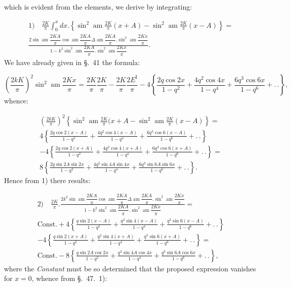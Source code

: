 \documentclass{article}
\begin{document}
which is evident from the elements, we derive by integrating:

\[
\begin{gathered}
\text{1)}\quad\frac{2K}{\pi}\int_{0}^{x}dx.\left\{\sin^{2}\operatorname{am}\frac{2K}{\pi}(x+A)-\sin^{2}\operatorname{am}\frac{2K}{\pi}(x-A)\right\}=\\[1.5ex]
\frac{2\sin\operatorname{am}\dfrac{2KA}{\pi}\cos\operatorname{am}\dfrac{2KA}{\pi}\Delta\operatorname{am}\dfrac{2KA}{\pi}.\sin^{2}\operatorname{am}\dfrac{2Kx}{\pi}}{1-k^{2}\sin^{2}\operatorname{am}\dfrac{2KA}{\pi}.\sin^{2}\operatorname{am}\dfrac{2Kx}{\pi}}.
\end{gathered}
\]
We have already given in §.\ 41 the formula:

\[
\left(\frac{2kK}{\pi}\right)^{2}\sin^{2}\operatorname{am}\frac{2Kx}{\pi}=\frac{2K}{\pi}\frac{2K}{\pi}-\frac{2K}{\pi}\frac{2E^{\mathrm{I}}}{\pi}-4\left\{\frac{2q\cos2x}{1-q^{2}}+\frac{4q^{2}\cos4x}{1-q^{4}}+\frac{6q^{3}\cos6x}{1-q^{6}}+.\,.\right\},
\]
whence:

\[
\begin{gathered}
\left(\frac{2kK}{\pi}\right)^{2}\left\{\sin^{2}\operatorname{am}\frac{2K}{\pi}(x+A-\sin^{2}\operatorname{am}\frac{2K}{\pi}(x-A)\right\}=\\[1.5ex]
4\left\{\frac{2q\cos2(x-A)}{1-q^{2}}+\frac{4q^{2}\cos4(x-A)}{1-q^{4}}+\frac{6q^{3}\cos6(x-A)}{1-q^{6}}+.\,.\right\}\\[1.5ex]
-4\left\{\frac{2q\cos2(x+A)}{1-q^{2}}+\frac{4q^{2}\cos4(x+A)}{1-q^{4}}+\frac{6q^{3}\cos6(x+A)}{1-q^{6}}+.\,.\right\}=\\[1.5ex]
8\left\{\frac{2q\sin2A\sin2x}{1-q^{2}}+\frac{4q^{2}\sin4A\sin4x}{1-q^{4}}+\frac{6q^{3}\sin6A\sin6x}{1-q^{6}}+.\,.\right\}.
\end{gathered}
\]
Hence from 1) there results:

\[
\begin{gathered}
\text{2)}\quad\frac{2K}{\pi}.\frac{2k^{2}\sin\operatorname{am}\dfrac{2KA}{\pi}\cos\operatorname{am}\dfrac{2KA}{\pi}\Delta\operatorname{am}\dfrac{2KA}{\pi}.\sin^{2}\operatorname{am}\dfrac{2Kx}{\pi}}{1-k^{2}\sin^{2}\operatorname{am}\dfrac{2KA}{\pi}.\sin^{2}\operatorname{am}\dfrac{2Kx}{\pi}}=\\[1.5ex]
\text{Const.}+4\left\{\frac{q\sin2(x-A)}{1-q^{2}}+\frac{q^{2}\sin4(x-A)}{1-q^{4}}+\frac{q^{3}\sin6(x-A)}{1-q^{6}}+.\,.\right\}\\[1.5ex]
-4\left\{\frac{q\sin2(x+A)}{1-q^{2}}+\frac{q^{2}\sin4(x+A)}{1-q^{4}}+\frac{q^{3}\sin6(x+A)}{1-q^{6}}+.\,.\right\}=\\[1.5ex]
\text{Const.}-8\left\{\frac{q\sin2A\cos2x}{1-q^{2}}+\frac{q^{2}\sin4A\cos4x}{1-q^{4}}+\frac{q^{3}\sin6A\cos6x}{1-q^{6}}+.\,.\right\},
\end{gathered}
\]
where the \emph{Constant} must be so determined that the proposed expression vanishes for $x=0$, whence from §.\ 47.\ 1):
\end{document}
